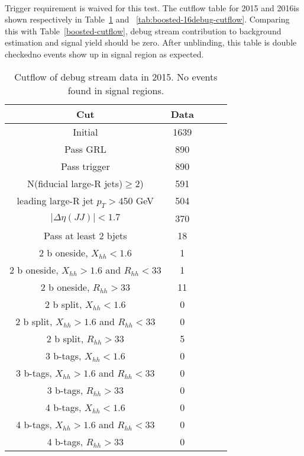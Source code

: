 \paragraph{}
Trigger requirement is waived for this test. The cutflow table for 2015 and 2016is shown respectively in Table~\ref{tab:boosted-15debug-cutflow} and ~\ref{tab:boosted-16debug-cutflow}. Comparing this with Table~\ref{boosted-cutflow}, debug stream contribution to background estimation and signal yield should be zero. After unblinding, this table is double checkedno events show up in signal region as expected.

\begin{table}[htbp!]
\begin{center}
\begin{tabular}{c|c|c|c|c}
Cut & Data \\
\hline
Initial & 1639  \\
Pass GRL & 890 \\
Pass trigger & 890 \\
N(fiducial large-R jets)$\geq 2$) & 591 \\
leading large-R jet $p_{T}>450$ GeV & 504 \\
$|\Delta\eta(JJ)|<1.7$ & 370 \\
Pass at least 2 bjets & 18 \\
\hline
2 b oneside, $X_{hh}<1.6$ & 1 \\
2 b oneside, $X_{hh}>1.6$ and $R_{hh}<33$ & 1 \\
2 b oneside, $R_{hh}>33$ & 11 \\
\hline
\hline
2 b split, $X_{hh}<1.6$ & 0 \\
2 b split, $X_{hh}>1.6$ and $R_{hh}<33$ & 0 \\
2 b split, $R_{hh}>33$ & 5 \\
\hline
\hline
3 b-tags, $X_{hh}<1.6$ & 0 \\
3 b-tags, $X_{hh}>1.6$ and $R_{hh}<33$ & 0 \\
3 b-tags, $R_{hh}>33$ & 0 \\
\hline
4 b-tags, $X_{hh}<1.6$ & 0 \\
4 b-tags, $X_{hh}>1.6$ and $R_{hh}<33$ & 0 \\
4 b-tags, $R_{hh}>33$ & 0 \\
\hline
\end{tabular}
\end{center}
\caption{Cutflow of debug stream data in 2015. No events found in signal regions.}
\label{tab:boosted-15debug-cutflow}
\end{table}

